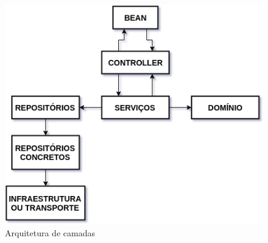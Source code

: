 \documentclass[
	article,			%
	11pt,				%
	oneside,			%
	a4paper,			%
	english,			%
	brazil,				%
	sumario=tradicional
	]{abntex2}
\begin{document}
\begin{figure}[H]
    \label{figure_arquitetura_camadas}
    \centering
    \caption{Arquitetura de camadas}
    \includegraphics[scale=0.8]{arquitetura_camadas.png}
    \hfill
\end{figure}
\end{document}
